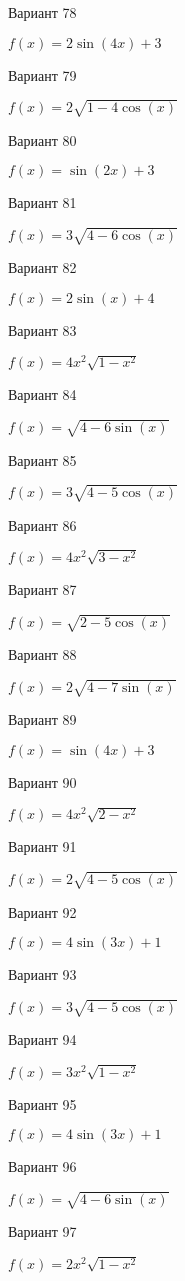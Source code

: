 \documentclass[11pt]{report}
\begin{document}
Вариант 78

$f(x) = 2 \sin{\left(4 x \right)} + 3$

Вариант 79

$f(x) = 2 \sqrt{1 - 4 \cos{\left(x \right)}}$

Вариант 80

$f(x) = \sin{\left(2 x \right)} + 3$

Вариант 81

$f(x) = 3 \sqrt{4 - 6 \cos{\left(x \right)}}$

Вариант 82

$f(x) = 2 \sin{\left(x \right)} + 4$

Вариант 83

$f(x) = 4 x^{2} \sqrt{1 - x^{2}}$

Вариант 84

$f(x) = \sqrt{4 - 6 \sin{\left(x \right)}}$

Вариант 85

$f(x) = 3 \sqrt{4 - 5 \cos{\left(x \right)}}$

Вариант 86

$f(x) = 4 x^{2} \sqrt{3 - x^{2}}$

Вариант 87

$f(x) = \sqrt{2 - 5 \cos{\left(x \right)}}$

Вариант 88

$f(x) = 2 \sqrt{4 - 7 \sin{\left(x \right)}}$

Вариант 89

$f(x) = \sin{\left(4 x \right)} + 3$

Вариант 90

$f(x) = 4 x^{2} \sqrt{2 - x^{2}}$

Вариант 91

$f(x) = 2 \sqrt{4 - 5 \cos{\left(x \right)}}$

Вариант 92

$f(x) = 4 \sin{\left(3 x \right)} + 1$

Вариант 93

$f(x) = 3 \sqrt{4 - 5 \cos{\left(x \right)}}$

Вариант 94

$f(x) = 3 x^{2} \sqrt{1 - x^{2}}$

Вариант 95

$f(x) = 4 \sin{\left(3 x \right)} + 1$

Вариант 96

$f(x) = \sqrt{4 - 6 \sin{\left(x \right)}}$

Вариант 97

$f(x) = 2 x^{2} \sqrt{1 - x^{2}}$
\end{document}
